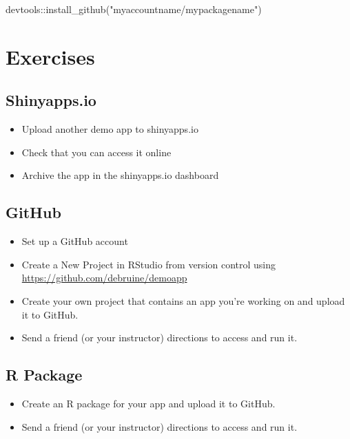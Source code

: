 \documentclass[
]{book}
\newenvironment{Shaded}{\begin{snugshade}}{\end{snugshade}}
\newcommand{\FunctionTok}[1]{\textcolor[rgb]{0.00,0.00,0.00}{#1}}
\newcommand{\NormalTok}[1]{#1}
\newcommand{\SpecialCharTok}[1]{\textcolor[rgb]{0.00,0.00,0.00}{#1}}
\newcommand{\StringTok}[1]{\textcolor[rgb]{0.31,0.60,0.02}{#1}}
\providecommand{\tightlist}{%
  \setlength{\itemsep}{0pt}\setlength{\parskip}{0pt}}
\begin{document}
\begin{Shaded}
\begin{Highlighting}[]
\NormalTok{devtools}\SpecialCharTok{::}\FunctionTok{install\_github}\NormalTok{(}\StringTok{"myaccountname/mypackagename"}\NormalTok{)}
\end{Highlighting}
\end{Shaded}

\hypertarget{exercises-sharing}{%
\section{Exercises}\label{exercises-sharing}}

\hypertarget{shinyapps.io-1}{%
\subsection{Shinyapps.io}\label{shinyapps.io-1}}

\begin{itemize}
\tightlist
\item
  Upload another demo app to shinyapps.io
\item
  Check that you can access it online
\item
  Archive the app in the shinyapps.io dashboard
\end{itemize}

\hypertarget{github-1}{%
\subsection{GitHub}\label{github-1}}

\begin{itemize}
\tightlist
\item
  Set up a GitHub account
\item
  Create a New Project in RStudio from version control using \url{https://github.com/debruine/demoapp}
\item
  Create your own project that contains an app you're working on and upload it to GitHub.
\item
  Send a friend (or your instructor) directions to access and run it.
\end{itemize}

\hypertarget{r-package}{%
\subsection{R Package}\label{r-package}}

\begin{itemize}
\tightlist
\item
  Create an R package for your app and upload it to GitHub.
\item
  Send a friend (or your instructor) directions to access and run it.
\end{itemize}
\end{document}
